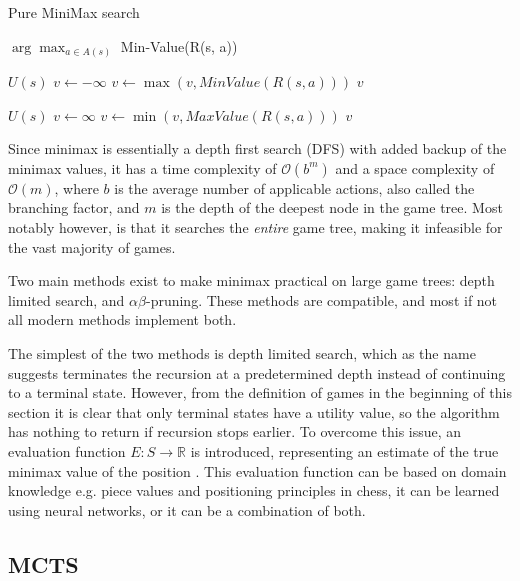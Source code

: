 \begin{algorithm}[H]
    \caption{Pure MiniMax search}
    \label{alg:minimax}
    \begin{algorithmic}[1]
    
        \State \Return $\arg\max_{a \in A(s)}$ Min-Value(R(s, a))
    \EndProcedure
    \end{algorithmic}

    \begin{algorithmic}[1]

            \Return $U(s)$
        \EndIf
        \State $v \leftarrow -\infty$
            \State $v \leftarrow \max(v, MinValue(R(s, a)))$
        \EndFor
        \State \Return $v$
    \EndProcedure
    
    \end{algorithmic}
        
    \begin{algorithmic}[1]

            \Return $U(s)$
        \EndIf
        \State $v \leftarrow \infty$
            \State $v \leftarrow \min(v, MaxValue(R(s, a)))$
        \EndFor
        \State \Return $v$
    \EndProcedure

    \end{algorithmic}
    \end{algorithm}

Since minimax is essentially a depth first
search (DFS) with added backup of the minimax values, it has a time complexity
of $\mathcal{O}(b^m)$ and a space complexity of $\mathcal{O}(m)$,
where $b$ is the average number of applicable actions, also called the 
branching factor, and $m$ is the depth of the deepest node in the game tree.
Most notably however, is that it searches the \textit{entire}
game tree, making it infeasible for the vast majority of games.

Two main methods exist to make minimax practical on large 
game trees: depth limited search, and $\alpha\beta$-pruning.
These methods are compatible, and most if not all modern methods
implement both. 

The simplest of the two methods is depth limited search, which
as the name suggests terminates the recursion at a predetermined
depth instead of continuing to a terminal state. However, from 
the definition of games in the beginning of this section it is
clear that only terminal states have a utility value, so the
algorithm has nothing to return if recursion stops earlier. To
overcome this issue, an evaluation function 
$E: S \rightarrow \mathbb{R}$ is introduced, representing an
estimate of the true minimax value of the position \revise. 
This evaluation function can be based on domain knowledge e.g.
piece values and positioning principles in chess, it can be
learned using neural networks, or it can be a combination of both.



\subsection{MCTS}
